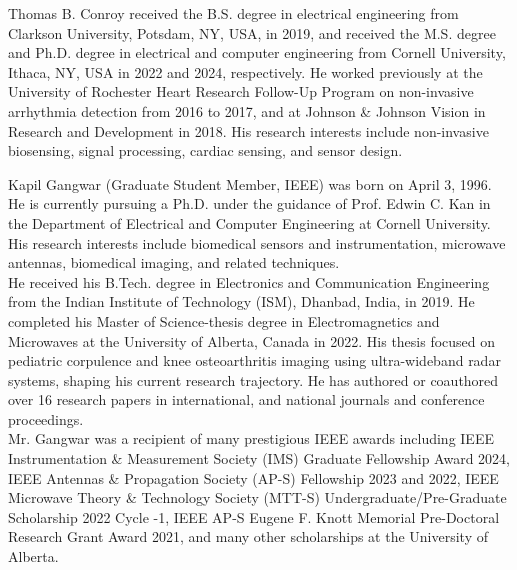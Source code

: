 \documentclass[journal,twoside,web]{ieeecolor}
\begin{document}
\begin{IEEEbiography}{Thomas B. Conroy} received the B.S. degree in electrical engineering from Clarkson University, Potsdam, NY, USA, in 2019, and received the M.S. degree and Ph.D. degree in electrical and computer engineering from Cornell University, Ithaca, NY, USA in 2022 and 2024, respectively. He worked previously at the University of Rochester Heart Research Follow-Up Program on non-invasive arrhythmia detection from 2016 to 2017, and at Johnson \& Johnson Vision in Research and Development in 2018. His research interests include non-invasive biosensing, signal processing, cardiac sensing, and sensor design.
\end{IEEEbiography}

\begin{IEEEbiography}{Kapil Gangwar} (Graduate Student Member, IEEE) was born on April 3, 1996. He is currently pursuing a Ph.D. under the guidance of Prof. Edwin C. Kan in the Department of Electrical and Computer Engineering at Cornell University. His research interests include biomedical sensors and instrumentation, microwave antennas, biomedical imaging, and related techniques. \\
He received his B.Tech. degree in Electronics and Communication Engineering from the Indian Institute of Technology (ISM), Dhanbad, India, in 2019. He completed his Master of Science-thesis degree in Electromagnetics and Microwaves at the University of Alberta, Canada in 2022. His thesis focused on pediatric corpulence and knee osteoarthritis imaging using ultra-wideband radar systems, shaping his current research trajectory. He has authored or coauthored over 16 research papers in international, and national journals and conference proceedings.\\
Mr. Gangwar was a recipient of many prestigious IEEE awards including IEEE Instrumentation \& Measurement Society (IMS) Graduate Fellowship Award 2024, IEEE Antennas \& Propagation Society (AP-S) Fellowship 2023 and 2022, IEEE Microwave Theory \& Technology Society (MTT-S) Undergraduate/Pre-Graduate Scholarship 2022 Cycle -1, IEEE AP-S Eugene F. Knott Memorial Pre-Doctoral Research Grant Award 2021, and many other scholarships at the University of Alberta.
\end{IEEEbiography}
\end{document}
